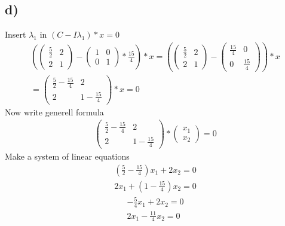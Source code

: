 \documentclass[12pt]{article}
\begin{document}
\subsection{d)}
Insert $\lambda_1$ in $(C - I\lambda_1) * x = 0 $
\begin{gather*}
    \left (
        \begin{pmatrix}
            \frac{5}{2} & 2 \\
            2 & 1 
    \end{pmatrix}
    -
   \begin{pmatrix}
       1 & 0 \\
            0 & 1 
    \end{pmatrix} 
    * \frac{15}{4} \right ) * x = 
    \left (
        \begin{pmatrix}
            \frac{5}{2} & 2 \\
            2 & 1 
    \end{pmatrix}
    -
   \begin{pmatrix}
       \frac{15}{4}  & 0 \\
       0 & \frac{15}{4} 
    \end{pmatrix} 
\right ) * x  \\
= \begin{pmatrix}
            \frac{5}{2} -\frac{15}{4} & 2 \\
            2 & 1 -\frac{15}{4} 
        \end{pmatrix} * x = 0 
\end{gather*}
Now  write generell formula
\begin{gather*}
 \begin{pmatrix}
            \frac{5}{2} -\frac{15}{4} & 2 \\
            2 & 1 -\frac{15}{4} 
        \end{pmatrix}  
        *
        \begin{pmatrix}
            x_1 \\
            x_2
        \end{pmatrix}
        =
        0
\end{gather*}
Make a system of linear equations
\begin{align}
    (\frac{5}{2} -\frac{15}{4})x_1 + 2x_2 = 0  \\
    2x_1 +(1 -\frac{15}{4})x_2 = 0 
\end{align}
\begin{align}
    -\frac{5}{4}x_1 + 2x_2 = 0  \\
    2x_1 -\frac{11}{4}x_2 = 0 
\end{align}
\end{document}
